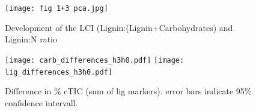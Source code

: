 


\newpage
\begin{figure}[p]
\vspace*{2mm}
\begin{center}
\texttt{[image: fig 1+3 pca.jpg]}
\end{center}
\caption{Development of the LCI (Lignin:(Lignin+Carbohydrates) and Lignin:N ratio}
\end{figure}


\newpage
\begin{figure}[p]
\vspace*{2mm}
\begin{center}
\texttt{[image: carb\_differences\_h3h0.pdf]}
\texttt{[image: lig\_differences\_h3h0.pdf]}
\end{center}
\caption{Difference in \% cTIC (sum of lig markers). error bars indicate 95\% confidence intervall.}
\end{figure}


